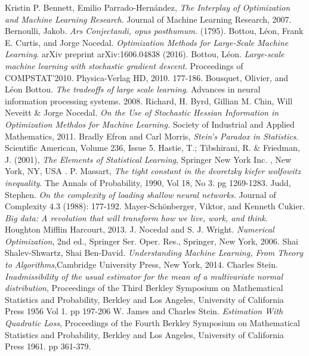\documentclass{book}
\theoremstyle{plain}
\theoremstyle{definition}
\theoremstyle{remark}
\begin{document}
\begin{thebibliography}{9}
 Kristin P. Bennett, Emilio Parrado-Hernández, \emph{The Interplay of Optimization and Machine Learning Research}. Journal of Machine Learning Research, 2007.
Bernoulli, Jakob. \emph{Ars Conjectandi, opus posthumum.} (1795).
Bottou, Léon, Frank E. Curtis, and Jorge Nocedal. \emph{Optimization Methods for Large-Scale Machine Learning}. arXiv preprint arXiv:1606.04838 (2016).
  Bottou, Léon. \emph{Large-scale machine learning with stochastic gradient descent}. Proceedings of COMPSTAT'2010. Physica-Verlag HD, 2010. 177-186.
Bousquet, Olivier, and Léon Bottou. \emph{The tradeoffs of large scale learning}. Advances in neural information processing systems. 2008.
 Richard, H. Byrd, Gillian M. Chin, Will Neveitt \& Jorge Nocedal.
  \emph{On the Use of Stochastic Hessian Information in Optimization Methdos for Machine Learning.} Society of Industrial and Applied Mathematics, 2011.
 Bradly Efron and Carl Morris, \emph{Stein's Paradox in Statistics}. Scientific American, Volume 236, Issue 5.
 Hastie, T.; Tibshirani, R. \& Friedman, J. (2001), \emph{The Elements of Statistical Learning}, Springer New York Inc. , New York, NY, USA .
 P. Massart, \emph{The tight constant in the dvoretzky kiefer wolfowitz inequality}. The Annals of Probability, 1990, Vol 18, No 3. pg 1269-1283. 
Judd, Stephen. \emph{On the complexity of loading shallow neural networks.} Journal of Complexity 4.3 (1988): 177-192.
 Mayer-Schönberger, Viktor, and Kenneth Cukier. \emph{Big data: A revolution that will transform how we live, work, and think}. Houghton Mifflin Harcourt, 2013.
 J. Nocedal and S. J. Wright. \emph{Numerical Optimization}, 2nd ed., Springer Ser. Oper. Res., Springer, New York, 2006.
 Shai Shalev-Shwartz, Shai Ben-David. \emph{Understanding Machine Learning, From Theory to Algorithms},Cambridge University Press, New York, 2014.
 Charles Stein. \emph{Inadmissibility of the usual estimator for the mean of a multivariate normal distribution}, Proceedings of the Third Berkley Symposium on Mathematical Statistics and Probability, Berkley and Los Angeles, University of California Press 1956 Vol 1. pp 197-206
 W. James and Charles Stein. \emph{Estimation With Quadratic Loss},  Proceedings of the Fourth Berkley Symposium on Mathematical Statistics and Probability, Berkley and Los Angeles, University of California Press 1961. pp 361-379.

\end{thebibliography}
\end{document}
